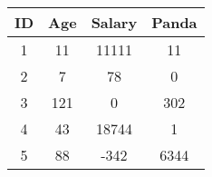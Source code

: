 \begin{tabular}{||c c c c||}
	\hline
	ID & Age & Salary & Panda \\
	\hline\hline
	1 & 11 & 11111 & 11 \\
	\hline
	2 & 7 & 78 & 0 \\
	\hline
	3 & 121 & 0 & 302 \\
	\hline
	4 & 43 & 18744 & 1 \\
	\hline
	5 & 88 & -342 & 6344 \\
	\hline
\end{tabular}
